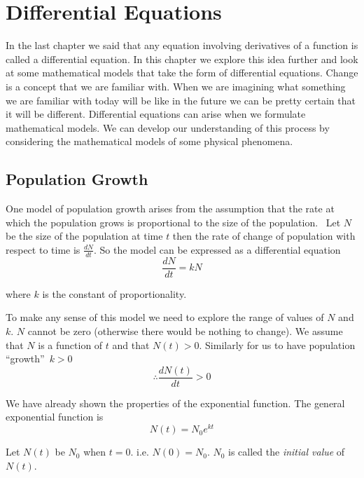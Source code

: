 \chapter{Differential Equations}

In the last chapter we said that any equation involving derivatives of a function is called a differential equation.  In
this chapter we explore this idea further and look at some mathematical models that take the form of differential equations.  Change
is a concept that we are familiar with.  When we are imagining what something we are familiar with today will
be like in the future we can be pretty certain that it will be different.  Differential equations can arise when
we formulate mathematical models.  We can develop our understanding of this process by considering the mathematical
models of some physical phenomena. 

\section{Population Growth}
One model of population growth arises from the assumption that the rate at which the population grows is proportional to the size of the population.
\ Let $N$ be the size of the population at time
$t$ then the rate of change of population with respect to time is $\frac{d N}{d t}\text{.}$  So the model can be expressed as a differential equation
\begin{equation*}\frac{d N}{d t} =k N
\end{equation*}

where $k$ is the constant of proportionality. 

To make any sense of this model we need to explore the range of values
of $N$ and $k$.  $N$ cannot be zero (otherwise there would be nothing to change).  We assume that $N$ is a function of $t$ and that $N (t) >0$.  Similarly for us to have population ``growth''\  $k >0$
\begin{equation*} \therefore \frac{d N (t)}{d t} >0
\end{equation*}

We have already shown the properties of the exponential function.  The
general exponential function is
\begin{equation*}N (t) =N_{0} e^{k t}
\end{equation*}

Let $N (t)$ be $N_{0}$ when $t =0$.  i.e. $N (0) =N_{0}\text{.}$  $N_{0}$ is called the \emph{initial value} of $N (t)$. 

